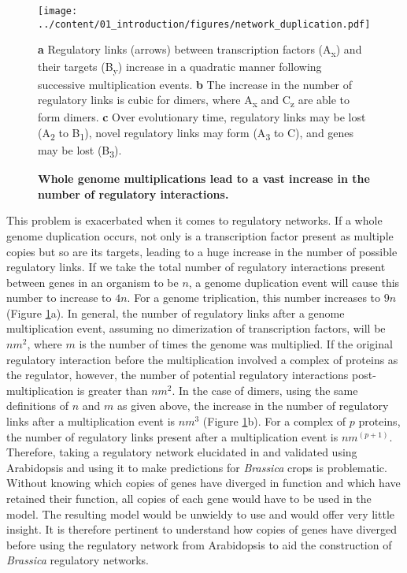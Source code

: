 \documentclass[12pt,]{book}
\begin{document}
\begin{figure}[htbp]
\centering
\texttt{[image: ../content/01\_introduction/figures/network\_duplication.pdf]}
\caption{\textbf{Whole genome multiplications lead to a vast increase in
the number of regulatory interactions.}}{\textbf{a} Regulatory links
(arrows) between transcription factors (A\textsubscript{x}) and their
targets (B\textsubscript{y}) increase in a quadratic manner following
successive multiplication events. \textbf{b} The increase in the number
of regulatory links is cubic for dimers, where A\textsubscript{x} and
C\textsubscript{z} are able to form dimers. \textbf{c} Over evolutionary
time, regulatory links may be lost (A\textsubscript{2} to
B\textsubscript{1}), novel regulatory links may form (A\textsubscript{3}
to C), and genes may be lost
(B\textsubscript{3}).}\label{figure:1xx:networkduplication}
\end{figure}

This problem is exacerbated when it comes to regulatory networks. If a
whole genome duplication occurs, not only is a transcription factor
present as multiple copies but so are its targets, leading to a huge
increase in the number of possible regulatory links. If we take the
total number of regulatory interactions present between genes in an
organism to be \(n\), a genome duplication event will cause this number
to increase to \(4n\). For a genome triplication, this number increases
to \(9n\) (Figure \ref{figure:1xx:networkduplication}a). In general, the
number of regulatory links after a genome multiplication event, assuming
no dimerization of transcription factors, will be \(nm^2\), where \(m\)
is the number of times the genome was multiplied. If the original
regulatory interaction before the multiplication involved a complex of
proteins as the regulator, however, the number of potential regulatory
interactions post-multiplication is greater than \(nm^2\). In the case
of dimers, using the same definitions of \(n\) and \(m\) as given above,
the increase in the number of regulatory links after a multiplication
event is \(nm^3\) (Figure \ref{figure:1xx:networkduplication}b). For a
complex of \(p\) proteins, the number of regulatory links present after
a multiplication event is \(nm^{(p+1)}\). Therefore, taking a regulatory
network elucidated in and validated using Arabidopsis and using it to
make predictions for \emph{Brassica} crops is problematic. Without
knowing which copies of genes have diverged in function and which have
retained their function, all copies of each gene would have to be used
in the model. The resulting model would be unwieldy to use and would
offer very little insight. It is therefore pertinent to understand how
copies of genes have diverged before using the regulatory network from
Arabidopsis to aid the construction of \emph{Brassica} regulatory
networks.
\end{document}
